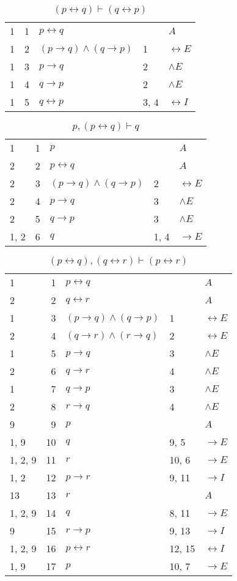 \documentclass{article}
\begin{document}
\begin{table}[htbp]\caption*{$(p↔q) ⊢ (q↔p)$}\centering\begin{tabular}{lrlll}
		{1} & 1 & $p↔q$ & {} & $A$ \\
		{1} & 2 & $(p→q)∧(q→p)$ & {1} & $↔E$ \\
		{1} & 3 & $p→q$ & {2} & $∧E$ \\
		{1} & 4 & $q→p$ & {2} & $∧E$ \\
		{1} & 5 & $q↔p$ & {3, 4} & $↔I$ \\
	\end{tabular}
\end{table}
\begin{table}[htbp]\caption*{$p,(p↔q) ⊢ q$}\centering\begin{tabular}{lrlll}
		{1} & 1 & $p$ & {} & $A$ \\
		{2} & 2 & $p↔q$ & {} & $A$ \\
		{2} & 3 & $(p→q)∧(q→p)$ & {2} & $↔E$ \\
		{2} & 4 & $p→q$ & {3} & $∧E$ \\
		{2} & 5 & $q→p$ & {3} & $∧E$ \\
		{1, 2} & 6 & $q$ & {1, 4} & $→E$ \\
	\end{tabular}
\end{table}
\clearpage
\begin{table}[htbp]\caption*{$(p↔q),(q↔r) ⊢ (p↔r)$}\centering\begin{tabular}{lrlll}
		{1} & 1 & $p↔q$ & {} & $A$ \\
		{2} & 2 & $q↔r$ & {} & $A$ \\
		{1} & 3 & $(p→q)∧(q→p)$ & {1} & $↔E$ \\
		{2} & 4 & $(q→r)∧(r→q)$ & {2} & $↔E$ \\
		{1} & 5 & $p→q$ & {3} & $∧E$ \\
		{2} & 6 & $q→r$ & {4} & $∧E$ \\
		{1} & 7 & $q→p$ & {3} & $∧E$ \\
		{2} & 8 & $r→q$ & {4} & $∧E$ \\
		{9} & 9 & $p$ & {} & $A$ \\
		{1, 9} & 10 & $q$ & {9, 5} & $→E$ \\
		{1, 2, 9} & 11 & $r$ & {10, 6} & $→E$ \\
		{1, 2} & 12 & $p→r$ & {9, 11} & $→I$ \\
		{13} & 13 & $r$ & {} & $A$ \\
		{1, 2, 9} & 14 & $q$ & {8, 11} & $→E$ \\
		{9} & 15 & $r→p$ & {9, 13} & $→I$ \\
		{1, 2, 9} & 16 & $p↔r$ & {12, 15} & $↔I$ \\
		{1, 9} & 17 & $p$ & {10, 7} & $→E$ \\
	\end{tabular}
\end{table}
\end{document}
